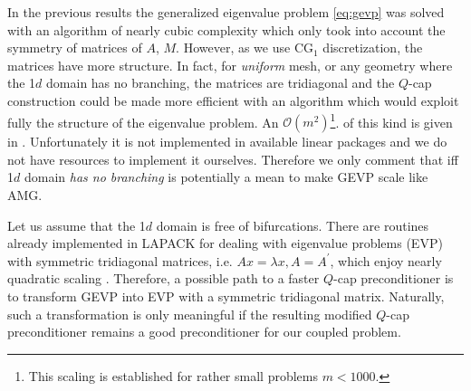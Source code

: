 \documentclass[10pt, a4paper]{article}
\newcommand{\dual}[1]{\ensuremath{{#1}^{\prime}}}
\begin{document}
In the previous results the generalized eigenvalue problem \eqref{eq:gevp} was 
solved with an algorithm of nearly cubic complexity which only took into account 
the symmetry of matrices of $A$, $M$. However, as we use CG$_1$ discretization, the matrices
have more structure. In fact, for \textit{uniform} mesh, or any geometry where
the 1$d$ domain has no branching, the matrices are tridiagonal and the $Q$-cap 
construction could be made more efficient with an algorithm which would exploit 
fully the structure of the eigenvalue problem. An $\mathcal{O}(m^2)$\footnote{This 
scaling is established for rather small problems $m<1000$.}. of this kind is given 
in \cite{gevp_s3d}. Unfortunately it is not implemented in available linear packages 
and we do not have resources to implement it ourselves. Therefore we only comment 
that iff 1$d$ domain \textit{has no branching} \cite{gevp_s3d} is potentially a mean 
to make GEVP scale like AMG.

Let us assume that the 1$d$ domain is free of bifurcations. There are routines already 
implemented in LAPACK for dealing with eigenvalue problems (EVP) with symmetric 
tridiagonal matrices, i.e. $Ax=\lambda x, A=\dual{A}$, which enjoy nearly quadratic 
scaling \cite{demmel}. Therefore, a possible path to a faster $Q$-cap preconditioner 
is to transform GEVP into EVP with a symmetric tridiagonal matrix. Naturally, such a 
transformation is only meaningful if the resulting modified $Q$-cap preconditioner 
remains a good preconditioner for our coupled problem.
\end{document}

